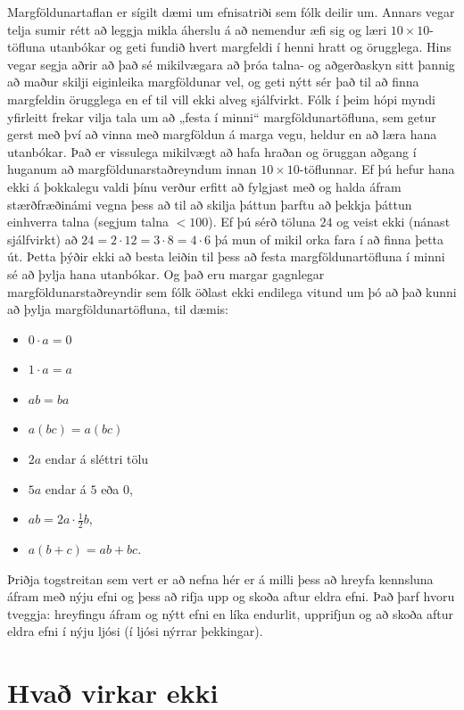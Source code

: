 \documentclass[
  icelandic,
]{book}
\providecommand{\tightlist}{%
  \setlength{\itemsep}{0pt}\setlength{\parskip}{0pt}}
\begin{document}
Margföldunartaflan er sígilt dæmi um efnisatriði sem fólk deilir um. Annars vegar telja sumir rétt að leggja mikla áherslu á að nemendur æfi sig og læri \(10 \times  10\)-töfluna utanbókar og geti fundið hvert margfeldi í henni hratt og örugglega. Hins vegar segja aðrir að það sé mikilvægara að þróa talna- og aðgerðaskyn sitt þannig að maður skilji eiginleika margföldunar vel, og geti nýtt sér það til að finna margfeldin örugglega en ef til vill ekki alveg sjálfvirkt. Fólk í þeim hópi myndi yfirleitt frekar vilja tala um að „festa í minni`` margföldunartöfluna, sem getur gerst með því að vinna með margföldun á marga vegu, heldur en að læra hana utanbókar. Það er vissulega mikilvægt að hafa hraðan og öruggan aðgang í huganum að margföldunarstaðreyndum innan \(10  \times 10\)-töflunnar. Ef þú hefur hana ekki á þokkalegu valdi þínu verður erfitt að fylgjast með og halda áfram stærðfræðinámi vegna þess að til að skilja þáttun þarftu að þekkja þáttun einhverra talna (segjum talna \(<100\)). Ef þú sérð töluna \(24\) og veist ekki (nánast sjálfvirkt) að \(24 = 2 \cdot 12 = 3 \cdot 8 = 4 \cdot 6\) þá mun of mikil orka fara í að finna þetta út. Þetta þýðir ekki að besta leiðin til þess að festa margföldunartöfluna í minni sé að þylja hana utanbókar. Og það eru margar gagnlegar margföldunarstaðreyndir sem fólk öðlast ekki endilega vitund um þó að það kunni að þylja margföldunartöfluna, til dæmis:

\begin{itemize}
\tightlist
\item
  \(0 \cdot a = 0\)
\item
  \(1 \cdot a = a\)
\item
  \(ab = ba\)
\item
  \(a(bc)=a(bc)\)
\item
  \(2a\) endar á sléttri tölu
\item
  \(5a\) endar á \(5\) eða \(0\),
\item
  \(ab = 2a \cdot \frac{1}{2}b\),
\item
  \(a(b+c) = ab + bc\).
\end{itemize}

Þriðja togstreitan sem vert er að nefna hér er á milli þess að hreyfa kennsluna áfram með nýju efni og þess að rifja upp og skoða aftur eldra efni. Það þarf hvoru tveggja: hreyfingu áfram og nýtt efni en líka endurlit, upprifjun og að skoða aftur eldra efni í nýju ljósi (í ljósi nýrrar þekkingar).

\section{Hvað virkar ekki}\label{hvauxf0-virkar-ekki}
\end{document}
